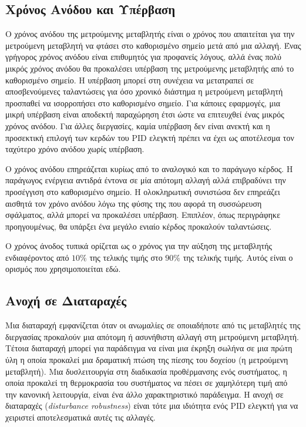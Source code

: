 \subsection{Χρόνος Ανόδου και Υπέρβαση}

Ο χρόνος ανόδου της μετρούμενης μεταβλητής είναι ο χρόνος που απαιτείται για την μετρούμενη μεταβλητή να φτάσει στο καθορισμένο σημείο μετά από μια αλλαγή. Ένας γρήγορος χρόνος ανόδου είναι επιθυμητός για προφανείς λόγους, αλλά ένας πολύ μικρός χρόνος ανόδου θα προκαλέσει υπέρβαση της μετρούμενης μεταβλητής από το καθορισμένο σημείο. Η υπέρβαση μπορεί στη συνέχεια να μετατραπεί σε αποσβενούμενες ταλαντώσεις για όσο χρονικό διάστημα η μετρούμενη μεταβλητή προσπαθεί να ισορροπήσει στο καθορισμένο σημείο. Για κάποιες εφαρμογές, μια μικρή υπέρβαση είναι αποδεκτή παραχώρηση έτσι ώστε να επιτευχθεί ένας μικρός χρόνος ανόδου. Για άλλες διεργασίες, καμία υπέρβαση δεν είναι ανεκτή και η προσεκτική επιλογή των κερδών του PID ελεγκτή πρέπει να έχει ως αποτέλεσμα τον ταχύτερο χρόνο ανόδου χωρίς υπέρβαση. 

Ο χρόνος ανόδου επηρεάζεται κυρίως από το αναλογικό και το παράγωγο κέρδος. Η παράγωγος ενέργεια αντιδρά έντονα σε μία απότομη αλλαγή αλλά επιβραδύνει την προσέγγιση στο καθορισμένο σημείο. Η ολοκληρωτική συνιστώσα δεν επηρεάζει αισθητά τον χρόνο ανόδου λόγω της φύσης της που αφορά τη συσσώρευση σφάλματος, αλλά μπορεί να προκαλέσει υπέρβαση. Επιπλέον, όπως περιγράφηκε προηγουμένως, θα υπάρξει ένα μεγάλο ενιαίο κέρδος προκαλούν ταλαντώσεις. 

Ο χρόνος άνοδος τυπικά ορίζεται ως ο χρόνος για την αύξηση της μεταβλητής ενδιαφέροντος από $10\%$ της τελικής τιμής στο $90\%$ της τελικής τιμής. Αυτός είναι ο ορισμός που χρησιμοποιείται εδώ.

\subsection{Ανοχή σε Διαταραχές}

Μια διαταραχή εμφανίζεται όταν οι ανωμαλίες σε οποιαδήποτε από τις μεταβλητές της διεργασίας προκαλούν μια απότομη ή ασυνήθιστη αλλαγή στη μετρούμενη μεταβλητή. Τέτοια διαταραχή μπορεί για παράδειγμα να είναι μια έκρηξη σωλήνα σε μια πρώτη ύλη η οποία προκαλεί μια δραματική πτώση της πίεσης του δοχείου (η μετρούμενη μεταβλητή). Μια δυσλειτουργία στη διαδικασία προθέρμανσης ενός συστήματος, η οποία προκαλεί τη θερμοκρασία του συστήματος να πέσει σε χαμηλότερη τιμή από την κανονική λειτουργία, είναι ένα άλλο χαρακτηριστικό παράδειγμα. Η ανοχή σε διαταραχές (\emph{disturbance robustness}) είναι τότε μια ιδιότητα ενός PID ελεγκτή για να χειριστεί αποτελεσματικά αυτές τις αλλαγές.

